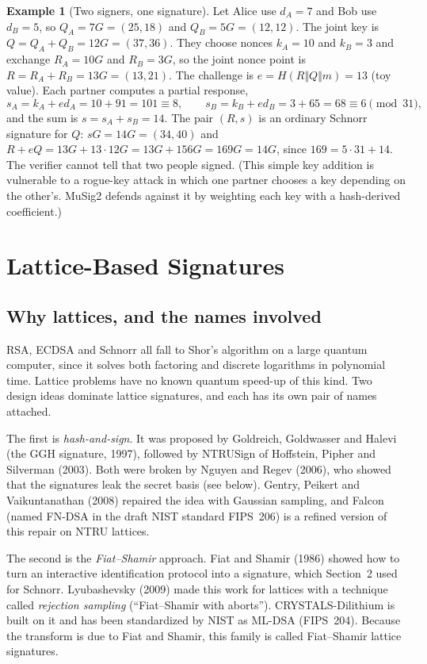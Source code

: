 \documentclass[11pt,a4paper]{article}
\theoremstyle{definition}
\newtheorem{example}[definition]{Example}
\newcommand{\Hash}{H}
\begin{document}
\begin{example}[Two signers, one signature]\label{ex:musig}
Let Alice use $d_A=7$ and Bob use $d_B=5$, so $Q_A=7G=(25,18)$ and $Q_B=5G=(12,12)$. The joint key is $Q=Q_A+Q_B=12G=(37,36)$. They choose nonces $k_A=10$ and $k_B=3$ and exchange $R_A=10G$ and $R_B=3G$, so the joint nonce point is $R=R_A+R_B=13G=(13,21)$. The challenge is $e=\Hash(R\Vert Q\Vert m)=13$ (toy value). Each partner computes a partial response,
\[
s_A=k_A+ed_A=10+91=101\equiv 8,\qquad s_B=k_B+ed_B=3+65=68\equiv 6 \pmod{31},
\]
and the sum is $s=s_A+s_B=14$. The pair $(R,s)$ is an ordinary Schnorr signature for $Q$: $sG=14G=(34,40)$ and $R+eQ=13G+13\cdot 12G=13G+156G=169G=14G$, since $169=5\cdot 31+14$. The verifier cannot tell that two people signed. (This simple key addition is vulnerable to a rogue-key attack in which one partner chooses a key depending on the other's. MuSig2 defends against it by weighting each key with a hash-derived coefficient.)
\end{example}

\section{Lattice-Based Signatures}

\subsection{Why lattices, and the names involved}

RSA, ECDSA and Schnorr all fall to Shor's algorithm on a large quantum computer, since it solves both factoring and discrete logarithms in polynomial time. Lattice problems have no known quantum speed-up of this kind. Two design ideas dominate lattice signatures, and each has its own pair of names attached.

The first is \emph{hash-and-sign}. It was proposed by Goldreich, Goldwasser and Halevi (the GGH signature, 1997), followed by NTRUSign of Hoffstein, Pipher and Silverman (2003). Both were broken by Nguyen and Regev (2006), who showed that the signatures leak the secret basis (see below). Gentry, Peikert and Vaikuntanathan (2008) repaired the idea with Gaussian sampling, and Falcon (named FN-DSA in the draft NIST standard FIPS~206) is a refined version of this repair on NTRU lattices.

The second is the \emph{Fiat--Shamir} approach. Fiat and Shamir (1986) showed how to turn an interactive identification protocol into a signature, which Section~2 used for Schnorr. Lyubashevsky (2009) made this work for lattices with a technique called \emph{rejection sampling} (``Fiat--Shamir with aborts''). CRYSTALS-Dilithium is built on it and has been standardized by NIST as ML-DSA (FIPS~204). Because the transform is due to Fiat and Shamir, this family is called Fiat--Shamir lattice signatures.
\end{document}
